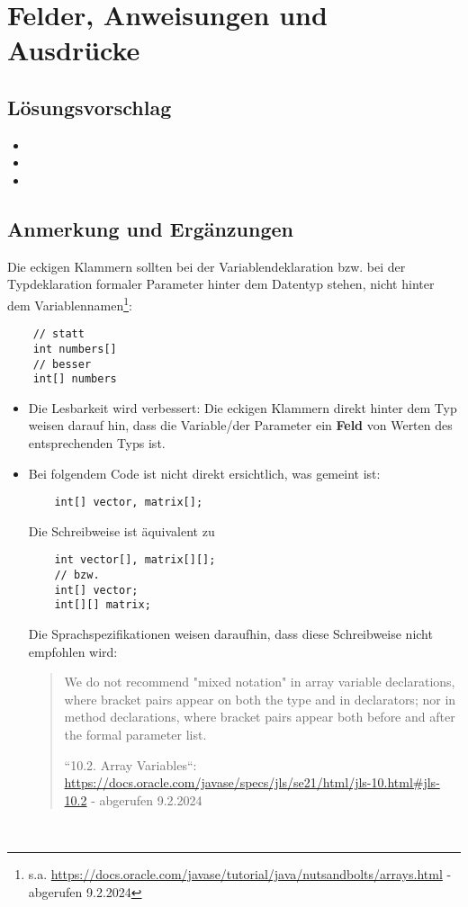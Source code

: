 \chapter{Felder, Anweisungen und Ausdrücke}

\section{Lösungsvorschlag}

\begin{itemize}
    \item {}
    \item {}
    \item {}
\end{itemize}

\section{Anmerkung und Ergänzungen}

Die eckigen Klammern sollten bei der Variablendeklaration {bzw.} bei der Typdeklaration formaler Parameter hinter dem Datentyp stehen, nicht hinter dem Variablennamen\footnote{
    s.a. \url{https://docs.oracle.com/javase/tutorial/java/nutsandbolts/arrays.html} - abgerufen 9.2.2024}:

\begin{verbatim}
    // statt
    int numbers[]
    // besser
    int[] numbers
\end{verbatim}

\begin{itemize}
    \item Die Lesbarkeit wird verbessert: Die eckigen Klammern direkt hinter dem Typ weisen darauf hin, dass die Variable/der Parameter ein \textbf{Feld} von Werten des entsprechenden Typs ist.
    \item Bei folgendem Code ist nicht direkt ersichtlich, was gemeint ist:
    \begin{verbatim}
    int[] vector, matrix[];
    \end{verbatim}
    Die Schreibweise ist äquivalent zu
    \begin{verbatim}
    int vector[], matrix[][];
    // bzw.
    int[] vector;
    int[][] matrix;
    \end{verbatim}
    Die Sprachspezifikationen weisen daraufhin, dass diese Schreibweise nicht empfohlen wird:
    \blockquote[{``10.2. Array Variables``: \url{https://docs.oracle.com/javase/specs/jls/se21/html/jls-10.html#jls-10.2} - abgerufen 9.2.2024}]{
        We do not recommend "mixed notation" in array variable declarations, where bracket pairs appear on both the type and in declarators; nor in method declarations, where bracket pairs appear both before and after the formal parameter list.
    }
\end{itemize}\\

